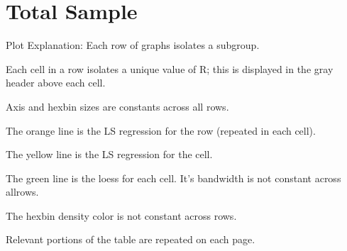 \documentclass[a4paper]{article}
\begin{document}
\section{Total Sample}
Plot Explanation: Each row of graphs isolates a subgroup.  

Each cell in a row isolates a unique value of R; this is displayed in the gray header above each cell. 

Axis and hexbin sizes are constants across all rows.

The orange line is the LS regression for the row (repeated in each cell).

The yellow line is the LS regression for the cell.

The green line is the loess for each cell.  It's bandwidth is not constant across allrows.

The hexbin density color is not constant across rows.

Relevant portions of the table are repeated on each page.

\end{document}
